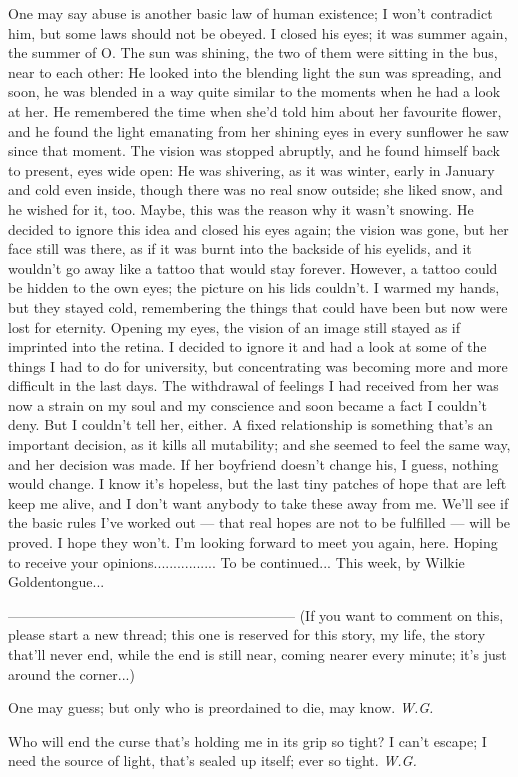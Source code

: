 One may say abuse is another basic law of human existence; I won't contradict him, but some laws should not be obeyed. 
I closed his eyes; it was summer again, the summer of O. The sun was shining, the two of them were sitting in the bus, near to each other: He looked into the blending light the sun was spreading, and soon, he was blended in a way quite similar to the moments when he had a look at her. He remembered the time when she'd told him about her favourite flower, and he found the light emanating from her shining eyes in every sunflower he saw since that moment. 
The vision was stopped abruptly, and he found himself back to present, eyes wide open: He was shivering, as it was winter, early in January and cold even inside, though there was no real snow outside; she liked snow, and he wished for it, too. 
Maybe, this was the reason why it wasn't snowing. 
He decided to ignore this idea and closed his eyes again; the vision was gone, but her face still was there, as if it was burnt into the backside of his eyelids, and it wouldn't go away like a tattoo that would stay forever. 
However, a tattoo could be hidden to the own eyes; the picture on his lids couldn't. 
I warmed my hands, but they stayed cold, remembering the things that could have been but now were lost for eternity. 
Opening my eyes, the vision of an image still stayed as if imprinted into the retina. I decided to ignore it and had a look at some of the things I had to do for university, but concentrating was becoming more and more difficult in the last days. 
The withdrawal of feelings I had received from her was now a strain on my soul and my conscience and soon became a fact I couldn't deny. 
But I couldn't tell her, either. 
A fixed relationship is something that's an important decision, as it kills all mutability; and she seemed to feel the same way, and her decision was made. 
If her boyfriend doesn't change his, I guess, nothing would change. 
I know it's hopeless, but the last tiny patches of hope that are left keep me alive, and I don't want anybody to take these away from me. 
We'll see if the basic rules I've worked out --- that real hopes are not to be fulfilled --- will be proved. 
I hope they won't. 
I'm looking forward to meet you again, here. 
Hoping to receive your opinions................
To be continued...
This week, by Wilkie Goldentongue...

--------------------------------------------------------------
(If you want to comment on this, please start a new thread; this one is reserved for this story, my life, the story that'll never end, while the end is still near, coming nearer every minute; it's just around the corner...)

One may guess;
but only who is preordained to die,
may know. 
\emph{W.G.}

Who will end the curse that's holding me in its grip so tight?
I can't escape;
I need the source of light,
that's sealed up itself;
ever so tight. 
\emph{W.G.}

